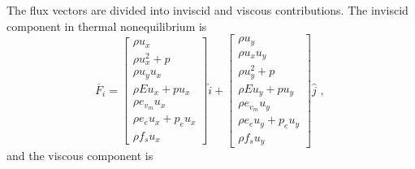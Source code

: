 \medskip
The flux vectors are divided into inviscid and viscous contributions.  
The inviscid component in thermal nonequilibrium is
\begin{equation}
 \overline{F}_{i} = \left [ \begin{array}{c}
                               \rho u_{x} \\
                               \rho u_{x}^{2} + p \\
                               \rho u_{y} u_{x} \\
                               \rho E u_{x} + p u_{x} \\
                               \rho e_{v_{m}} u_{x} \\
                               \rho e_{e} u_{x} + p_{e} u_{x} \\
                               \rho f_{s} u_{x}
                            \end{array} \right ] \hat{i} 
                  + \left [ \begin{array}{c} 
                               \rho u_{y} \\
                               \rho u_{x} u_{y} \\
                               \rho u_{y}^{2} + p \\
                               \rho E u_{y} + p u_{y} \\
                               \rho e_{v_{m}} u_{y} \\
                               \rho e_{e} u_{y} + p_{e} u_{y} \\
                               \rho f_{s} u_{y}
                            \end{array} \right ] \hat{j} \text{ , }
 \label{eq:F_i}
\end{equation}
and the viscous component is
